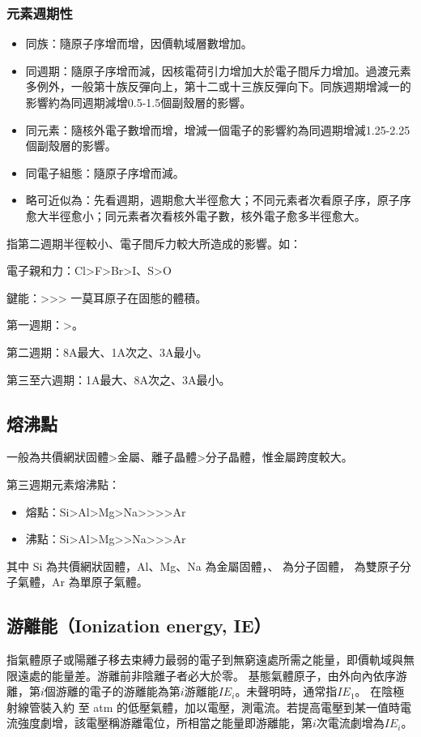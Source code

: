 \documentclass[a4paper,12pt]{article}
\begin{document}
\subsubsection{元素週期性}
\begin{itemize}
\item 同族：隨原子序增而增，因價軌域層數增加。
\item 同週期：隨原子序增而減，因核電荷引力增加大於電子間斥力增加。過渡元素多例外，一般第十族反彈向上，第十二或十三族反彈向下。同族週期增減一的影響約為同週期減增0.5-1.5個副殼層的影響。
\item 同元素：隨核外電子數增而增，增減一個電子的影響約為同週期增減1.25-2.25個副殼層的影響。
\item 同電子組態：隨原子序增而減。
\item 略可近似為：先看週期，週期愈大半徑愈大；不同元素者次看原子序，原子序愈大半徑愈小；同元素者次看核外電子數，核外電子愈多半徑愈大。
\end{itemize}
指第二週期半徑較小、電子間斥力較大所造成的影響。如：
\bit
\item 電子親和力：Cl>F>Br>I、S>O
\item 鍵能：>>>
\eit
{}
一莫耳原子在固態的體積。
\bit
\item 第一週期：>。
\item 第二週期：8A最大、1A次之、3A最小。
\item 第三至六週期：1A最大、8A次之、3A最小。
\eit
\subsection{熔沸點}
一般為共價網狀固體>金屬、離子晶體>分子晶體，惟金屬跨度較大。

第三週期元素熔沸點：
\begin{itemize}
\item 熔點：Si>Al>Mg>Na>>>>Ar
\item 沸點：Si>Al>Mg>>Na>>>Ar
\end{itemize}
其中 Si 為共價網狀固體，Al、Mg、Na 為金屬固體，、 為分子固體， 為雙原子分子氣體，Ar 為單原子氣體。
\subsection{游離能（Ionization energy, IE）}
\bctf{}\caption{First ionization energies. Double sharp, 2021.}\efct
{}
指氣體原子或陽離子移去束縛力最弱的電子到無窮遠處所需之能量，即價軌域與無限遠處的能量差。游離前非陰離子者必大於零。
基態氣體原子，由外向內依序游離，第$i$個游離的電子的游離能為第$i$游離能$IE_i$。未聲明時，通常指$IE_1$。
在陰極射線管裝入約 至 atm 的低壓氣體，加以電壓，測電流。若提高電壓到某一值時電流強度劇增，該電壓稱游離電位，所相當之能量即游離能，第$i$次電流劇增為$IE_i$。
\end{document}
